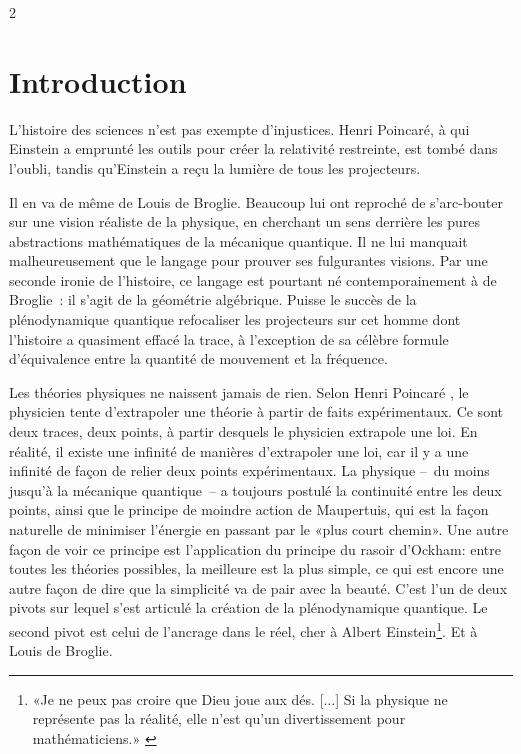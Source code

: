 \begin{multicols}{2}
	
\section{Introduction}

L'histoire des sciences n'est pas exempte d'injustices. Henri Poincaré,
à qui Einstein a emprunté les outils pour créer la relativité
restreinte, est tombé dans l'oubli, tandis qu'Einstein a reçu la lumière
de tous les projecteurs.

Il en va de même de Louis de Broglie. Beaucoup lui ont reproché de
s'arc-bouter sur une vision réaliste de la physique, en cherchant un
sens derrière les pures abstractions mathématiques de la mécanique
quantique. Il ne lui manquait malheureusement que le langage pour
prouver ses fulgurantes visions. Par une seconde ironie de l'histoire,
ce langage est pourtant né contemporainement à de Broglie : il s'agit de la
géométrie algébrique. Puisse le succès de la plénodynamique quantique
refocaliser les projecteurs sur cet homme dont l'histoire a quasiment
effacé la trace, à l'exception de sa célèbre formule d'équivalence
entre la quantité de mouvement et la fréquence.
\medskip

Les théories physiques ne naissent jamais de rien. Selon Henri
Poincaré \cite{poincare:1902:sh}, le physicien tente
d'extrapoler une théorie à partir de faits expérimentaux. Ce sont deux
traces, deux points, à partir desquels le physicien extrapole une loi.
En réalité, il existe une infinité de manières d'extrapoler une loi, car il y a une infinité de façon de relier deux points expérimentaux. La physique --~du moins jusqu'à la mécanique quantique~--
a toujours postulé la continuité entre les deux points, ainsi que le
principe de moindre action de Maupertuis, qui est la façon naturelle
de minimiser l'énergie en passant par le «plus court chemin». Une
autre façon de voir ce principe est l'application du principe du
rasoir d'Ockham: entre toutes les théories possibles, la meilleure
est la plus simple, ce qui est encore une autre façon de dire que la
simplicité va de pair avec la beauté. C'est l'un de deux pivots sur
lequel s'est articulé la création de la plénodynamique quantique. Le
second pivot est celui de l'ancrage dans le réel, cher à Albert
Einstein\footnote{«Je ne peux pas croire que Dieu joue aux dés. [$\ldots$] Si la physique ne représente pas la réalité, elle n'est qu'un divertissement pour mathématiciens.» \cite{EinsteinBorn2005}}. \cite{einstein1949autobiographical} Et à Louis de Broglie. \cite{debroglie1976physique}


\end{multicols}
